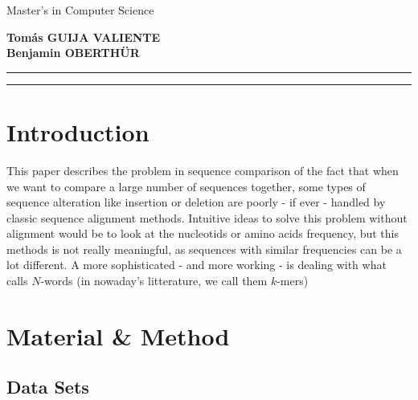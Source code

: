\documentclass[english,13pt,a4paper]{article}
\theoremstyle{definition}
\theoremstyle{remark}
\begin{document}
\begin{titlepage}
\vspace{15mm}

Master's in Computer Science\\  %

\vspace{15mm}

\Large 
{\color{BleuFonce} \textbf{Tom\'as GUIJA VALIENTE}}\\
{\color{BleuFonce} \textbf{Benjamin OBERTHÜR}}

\vspace{20mm}

\centering

\hrule
\begin{abstract}
    \lipsum*[1]
\end{abstract}
\vspace*{3mm}
\hrule

\end{titlepage}


\normalsize
\tableofcontents

\newpage


\section{Introduction}

This paper describes the problem in sequence comparison of the fact that when we want to compare a large number of sequences together, some types of sequence alteration like insertion or deletion are poorly - if ever - handled by classic sequence alignment methods. Intuitive ideas to solve this problem without alignment would be to look at the nucleotids or amino acids frequency, but this methods is not really meaningful, as sequences with similar frequencies can be a lot different. A more sophisticated - and more working - is dealing with what~\cite{didier_comparing_2007} calls $N$-words (in nowaday's litterature, we call them $k$-mers)

\section{Material \& Method}

\subsection{Data Sets}\label{ssec:DS}
\end{document}
